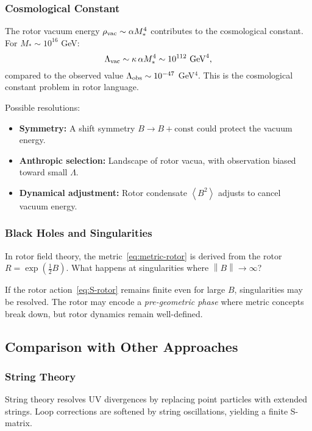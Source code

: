 \documentclass[11pt,a4paper]{article}
\numberwithin{equation}{section}
\theoremstyle{plain}
\theoremstyle{definition}
\theoremstyle{remark}
\newcommand{\norm}[1]{\left\lVert#1\right\rVert}
\newcommand{\avg}[1]{\left\langle #1 \right\rangle}
\begin{document}
\subsubsection{Cosmological Constant}

The rotor vacuum energy $\rho_{\rm vac}\sim \alpha M_*^4$ contributes to the cosmological constant. For $M_*\sim 10^{16}$ GeV:
\begin{equation}
\Lambda_{\rm vac} \sim \kappa\,\alpha M_*^4 \sim 10^{112}\text{ GeV}^4,
\label{eq:Lambda-vac}
\end{equation}
compared to the observed value $\Lambda_{\rm obs}\sim 10^{-47}$ GeV$^4$. This is the cosmological constant problem in rotor language.

Possible resolutions:
\begin{itemize}
  \item \textbf{Symmetry:} A shift symmetry $B\to B+\text{const}$ could protect the vacuum energy.
  \item \textbf{Anthropic selection:} Landscape of rotor vacua, with observation biased toward small $\Lambda$.
  \item \textbf{Dynamical adjustment:} Rotor condensate $\avg{B^2}$ adjusts to cancel vacuum energy.
\end{itemize}

\subsubsection{Black Holes and Singularities}

In rotor field theory, the metric~\eqref{eq:metric-rotor} is derived from the rotor $R=\exp(\tfrac12 B)$. What happens at singularities where $\norm{B}\to\infty$?

If the rotor action~\eqref{eq:S-rotor} remains finite even for large $B$, singularities may be resolved. The rotor may encode a \emph{pre-geometric phase} where metric concepts break down, but rotor dynamics remain well-defined.

\subsection{Comparison with Other Approaches}

\subsubsection{String Theory}

String theory resolves UV divergences by replacing point particles with extended strings. Loop corrections are softened by string oscillations, yielding a finite S-matrix.
\end{document}

